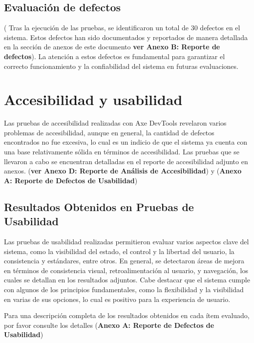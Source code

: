 \documentclass[stu, 12pt, letterpaper, donotrepeattitle, floatsintext, natbib]{apa7}
\begin{document}
\subsection{Evaluación de defectos}
(
Tras la ejecución de las pruebas, se identificaron un total de 30 defectos en el sistema. Estos defectos han sido documentados y reportados de manera detallada en la sección de anexos de este documento \textbf{ver Anexo B: Reporte de defectos}). La atención a estos defectos es fundamental para garantizar el correcto funcionamiento y la confiabilidad del sistema en futuras evaluaciones. 



\newpage

\section{Accesibilidad y usabilidad}

Las pruebas de accesibilidad realizadas con Axe DevTools revelaron varios problemas de accesibilidad, aunque en general, la cantidad de defectos encontrados no fue excesiva, lo cual es un indicio de que el sistema ya cuenta con una base relativamente sólida en términos de accesibilidad. Las pruebas que se llevaron a cabo se encuentran detalladas en el reporte de accesibilidad adjunto en anexos. (\textbf{ver Anexo D: Reporte de Análisis de Accesibilidad}) y  (\textbf{Anexo A: Reporte de Defectos de Usabilidad})
\subsection{Resultados Obtenidos en Pruebas de Usabilidad}

Las pruebas de usabilidad realizadas permitieron evaluar varios aspectos clave del sistema, como la visibilidad del estado, el control y la libertad del usuario, la consistencia y estándares, entre otros. En general, se detectaron áreas de mejora en términos de consistencia visual, retroalimentación al usuario, y navegación, los cuales se detallan en los resultados adjuntos. Cabe destacar que el sistema cumple con algunos de los principios fundamentales, como la flexibilidad y la visibilidad en varias de sus opciones, lo cual es positivo para la experiencia de usuario.

\noindent Para una descripción completa de los resultados obtenidos en cada ítem evaluado, por favor consulte los detalles (\textbf{Anexo A: Reporte de Defectos de Usabilidad})

\newpage
\end{document}
